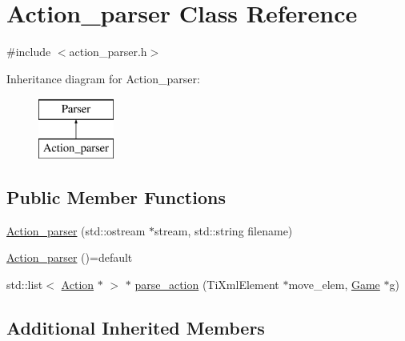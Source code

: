 \hypertarget{class_action__parser}{\section{Action\-\_\-parser Class Reference}
\label{class_action__parser}
}


{\ttfamily \#include $<$action\-\_\-parser.\-h$>$}

Inheritance diagram for Action\-\_\-parser\-:\begin{figure}[H]
\begin{center}
\leavevmode
\includegraphics[height=2.000000cm]{class_action__parser}
\end{center}
\end{figure}
\subsection*{Public Member Functions}
\begin{DoxyCompactItemize}
\item 
\hyperlink{class_action__parser_a3c55a5dc1dacc4679fd8cf805a13845d}{Action\-\_\-parser} (std\-::ostream $\ast$stream, std\-::string filename)
\item 
\hyperlink{class_action__parser_a7fa6713374665d4f749a6fd512a45c80}{Action\-\_\-parser} ()=default
\item 
std\-::list$<$ \hyperlink{class_action}{Action} $\ast$ $>$ $\ast$ \hyperlink{class_action__parser_a7a5c51bd19b76b5db663e8b2c7bcf822}{parse\-\_\-action} (Ti\-Xml\-Element $\ast$move\-\_\-elem, \hyperlink{class_game}{Game} $\ast$g)
\end{DoxyCompactItemize}
\subsection*{Additional Inherited Members}


